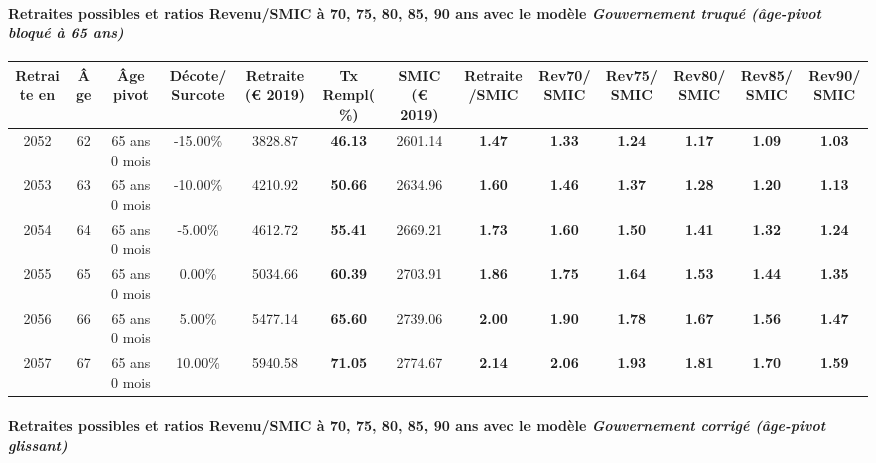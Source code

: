 \paragraph{Retraites possibles et ratios Revenu/SMIC à 70, 75, 80, 85, 90 ans avec le modèle \emph{Gouvernement truqué (âge-pivot bloqué à 65 ans)}}  
 
{ \scriptsize \begin{center} 
\begin{tabular}[htb]{|c|c||c|c||c|c||c||c|c|c|c|c|c|} 
\hline 
 Retraite en &  Âge &  Âge pivot &  Décote/Surcote &  Retraite (\euro{} 2019) &  Tx Rempl(\%) &  SMIC (\euro{} 2019) &  Retraite/SMIC &  Rev70/SMIC &  Rev75/SMIC &  Rev80/SMIC &  Rev85/SMIC &  Rev90/SMIC \\ 
\hline \hline 
 2052 &  62 &  65 ans 0 mois &  -15.00\% &  3828.87 &  {\bf 46.13} &  2601.14 &  {\bf 1.47} &  {\bf 1.33} &  {\bf 1.24} &  {\bf 1.17} &  {\bf 1.09} &  {\bf 1.03} \\ 
\hline 
 2053 &  63 &  65 ans 0 mois &  -10.00\% &  4210.92 &  {\bf 50.66} &  2634.96 &  {\bf 1.60} &  {\bf 1.46} &  {\bf 1.37} &  {\bf 1.28} &  {\bf 1.20} &  {\bf 1.13} \\ 
\hline 
 2054 &  64 &  65 ans 0 mois &  -5.00\% &  4612.72 &  {\bf 55.41} &  2669.21 &  {\bf 1.73} &  {\bf 1.60} &  {\bf 1.50} &  {\bf 1.41} &  {\bf 1.32} &  {\bf 1.24} \\ 
\hline 
 2055 &  65 &  65 ans 0 mois &  0.00\% &  5034.66 &  {\bf 60.39} &  2703.91 &  {\bf 1.86} &  {\bf 1.75} &  {\bf 1.64} &  {\bf 1.53} &  {\bf 1.44} &  {\bf 1.35} \\ 
\hline 
 2056 &  66 &  65 ans 0 mois &  5.00\% &  5477.14 &  {\bf 65.60} &  2739.06 &  {\bf 2.00} &  {\bf 1.90} &  {\bf 1.78} &  {\bf 1.67} &  {\bf 1.56} &  {\bf 1.47} \\ 
\hline 
 2057 &  67 &  65 ans 0 mois &  10.00\% &  5940.58 &  {\bf 71.05} &  2774.67 &  {\bf 2.14} &  {\bf 2.06} &  {\bf 1.93} &  {\bf 1.81} &  {\bf 1.70} &  {\bf 1.59} \\ 
\hline 
\hline 
\end{tabular} 
\end{center} } 
\paragraph{Retraites possibles et ratios Revenu/SMIC à 70, 75, 80, 85, 90 ans avec le modèle \emph{Gouvernement corrigé (âge-pivot glissant)}}  
 
